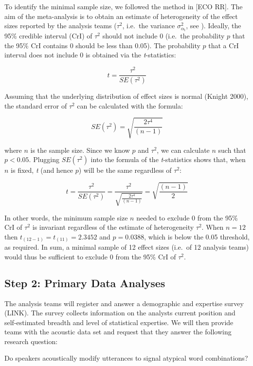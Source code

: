 \documentclass[
  12pt,
]{article}
\begin{document}
To identify the minimal sample size, we followed the method in {[}ECO RR{]}.
The aim of the meta-analysis is to obtain an estimate of heterogeneity of the effect sizes reported by the analysis teams (\(\tau^2\), i.e.~the variance \(\sigma^2_{\alpha_{\text{t}}}\), see ).
Ideally, the 95\% credible interval (CrI) of \(\tau^2\) should not include 0 (i.e.~the probability \(p\) that the 95\% CrI contains 0 should be less than 0.05).
The probability \(p\) that a CrI interval does not include 0 is obtained via the \emph{t}-statistics:

\[t = \frac{\tau^2}{SE(\tau^2)}\]

Assuming that the underlying distribution of effect sizes is normal (Knight 2000), the standard error of \(\tau^2\) can be calculated with the formula:

\[SE(\tau^2) = \sqrt{\frac{2\tau^4}{(n-1)}}\]

where \(n\) is the sample size.
Since we know \(p\) and \(\tau^2\), we can calculate \(n\) such that \(p < 0.05\).
Plugging \(SE(\tau^2)\) into the formula of the \emph{t}-statistics shows that, when \(n\) is fixed, \emph{t} (and hence \(p\)) will be the same regardless of \(\tau^2\):

\[t = \frac{\tau^2}{SE(\tau^2)} = \frac{\tau^2}{\sqrt{\frac{2\tau^4}{(n-1)}}} = \sqrt{\frac{(n-1)}{2}}\]

In other words, the minimum sample size \(n\) needed to exclude 0 from the 95\% CrI of \(\tau^2\) is invariant regardless of the estimate of heterogeneity \(\tau^2\).
When \(n = 12\) then \(t_{(12-1)} = t_{(11)} = 2.3452\) and \(p = 0.0388\), which is below the 0.05 threshold, as required.
In sum, a minimal sample of 12 effect sizes (i.e.~of 12 analysis teams) would thus be sufficient to exclude 0 from the 95\% CrI of \(\tau^2\).

\hypertarget{step-2-primary-data-analyses}{%
\subsection{Step 2: Primary Data Analyses}\label{step-2-primary-data-analyses}}

The analysis teams will register and answer a demographic and expertise survey (LINK).
The survey collects information on the analysts current position and self-estimated breadth and level of statistical expertise.
We will then provide teams with the acoustic data set and request that they answer the following research question:

Do speakers acoustically modify utterances to signal atypical word combinations?
\end{document}
